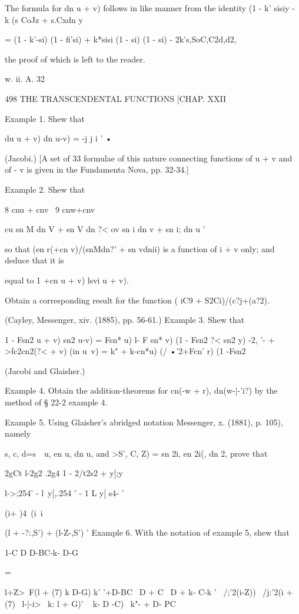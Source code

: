 The formula for dn u + v) follows in like manner from the identity (1
- k' sisiy - k (s CoJz + s.Cxdn y

= (1 - k'-si) (1 - fi'si) + k*sisi (1 - si) (1 - si) -
2k's,SoC,C2d,d2,

the proof of which is left to the reader.

w. ii. A. 32

498 THE TRANSCENDENTAL FUNCTIONS [CHAP. XXII

Example 1. Shew that

du u + v) dn u-v) = -j j i ' •

(Jacobi.) [A set of 33 formulae of this nature connecting functions of
u + v and of - v is given in the Fundamenta Nova, pp. 32-34.]

Example 2. Shew that

8 cnu + cnv \ 9 cnw+cnv

cu sn M dn V + sn V dn ?< ov sn i dn v + sn i; dn u '

so that (en r(+cn v)/(snMdn?' + sn vdnii) is a function of i + v only;
and deduce that it is

equal to 1 +cn u + v) lsvi u + v).

Obtain a corresponding result for the function ( iC9 +
S2Ci)/(c?j+(a?2).

(Cayley, Messenger, xiv. (1885), pp. 56-61.) Example 3. Shew that

1 - Fsn2 u + v) sn2 u-v) = Fsn* u) l- F sn* v) (1 - Fsn2 ?< sn2 y) -2,
'- + >fc2cn2(?< + v) (in u~v) = k" + k-cn*u) (/ •'2+Fcn' r) (1
-Fsn2%

(Jacobi and Glaisher.)

Example 4. Obtain the addition-theorems for cn(-w + r), dn(w-|-'i?) by
the method of § 22-2 example 4.

Example 5. Using Glaisher's abridged notation Messenger, x. (1881), p.
105), namely

s, c, d=s\ \ u, en u, dn u, and >S', C, Z) = sn 2i, en 2i(, dn 2,
prove that

2gCt l-2g2 .2g4 1 - 2/t2s2 + y[;y

l->;254' - l\ y[,.254 ' - 1 L y[ s4- '

(i+ )4\ (i\ i

(l + -?:,S') + (l-Z-,S') ' Example 6. With the notation of example 5,
shew that

1-C D D-BC-k- D-G

   =

l+Z>~F(l + (7) k D-G) k' '+D-BC \ D + C \ D + k- C-k ' \ /;'2(i-Z)) \
/j:'2(i + (7) ~l-|-i>~ k: l + G)' ~ k- D -C)~ k"- + D- PC

